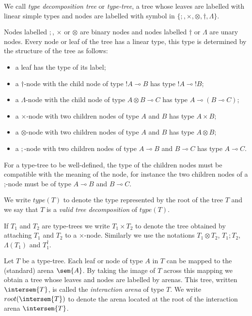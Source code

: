 \begin{dfn}
We call \emph{type decomposition tree} or \emph{type-tree}, a tree whose leaves are labelled with linear simple types
and nodes are labelled with symbol in $\{ ;, \times, \otimes, \dagger, \Lambda \}$.

Nodes labelled $;$, $\times$ or $\otimes$ are binary nodes and nodes labelled $\dagger$ or $\Lambda$ are unary nodes.
Every node or leaf of the tree has a linear type, this type is determined by the
structure of the tree as follows:
\begin{itemize}
\item a leaf has the type of its label;

\item a $\dagger$-node with the child node of type $!A \multimap B$ has type $!A \multimap !B$;

\item a $\Lambda$-node with the child node of type $A \otimes B \multimap C$ has type $A \multimap (B \multimap C)$;

\item a $\times$-node with two children nodes of type $A$
and $B$ has type $A \times B$;

\item a $\otimes$-node with two children nodes of type $A$
and $B$ has type $A\otimes B$;

\item a $;$-node with two children nodes of type $A\multimap B$
and $B \multimap C$ has type $A \multimap C$.
\end{itemize}

For a type-tree to be well-defined, the type of the children nodes
must be compatible with the meaning of the node, for instance the
two children nodes of a ;-node must be of type
$A\multimap B$ and $B\multimap C$.

We write $type(T)$ to denote the type represented by the root of the tree $T$ and we say that $T$ is a \emph{valid tree decomposition} of $type(T)$.

If $T_1$ and $T_2$ are type-trees we write $T_1 \times T_2$ to denote the tree obtained by attaching $T_1$ and $T_2$ to a $\times$-node.
Similarly we use the notations $T_1 \otimes T_2$, $T_1 ; T_2$, $\Lambda(T_1)$ and  $T_1^\dagger$.
\end{dfn}


Let $T$ be a type-tree. Each leaf or node of type $A$ in $T$ can be mapped to the
(standard) arena $\sem{A}$. By taking the image of $T$ across this mapping we obtain a tree whose leaves and nodes are labelled by arenas.
This tree, written $\intersem{T}$, is called the \emph{interaction arena} of type $T$.
We write $root(\intersem{T})$ to denote the arena located at the root of the interaction arena $\intersem{T}$.

